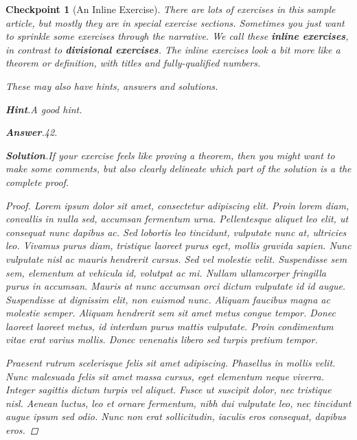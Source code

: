 \documentclass[pdflatex]{sn-jnl}
\theoremstyle{thmstyleone}%
\theoremstyle{thmstyletwo}%
\newtheorem{inlineexercise}[theorem]{Checkpoint}
\theoremstyle{thmstylethree}%
\newcommand{\blocktitlefont}{\relax}
\newcommand{\terminology}[1]{\textbf{#1}}
\numberwithin{equation}{section}
\begin{document}
\begin{inlineexercise}[An Inline Exercise]\label{inline-exercise}%
%
There are lots of exercises in this sample article, but mostly they are in special exercise sections.  Sometimes you just want to sprinkle some exercises through the narrative.  We call these \terminology{inline exercises}, in contrast to \terminology{divisional exercises}.  The inline exercises look a bit more like a theorem or definition, with titles and fully-qualified numbers.%
\par
These may also have hints, answers and solutions.%
\par\smallskip%
\noindent\textbf{\blocktitlefont Hint}.\hypertarget{inline-exercise-3}{}\quad{}A good hint.%
\par\smallskip%
\noindent\textbf{\blocktitlefont Answer}.\hypertarget{inline-exercise-4}{}\quad{}42.%
\par\smallskip%
\noindent\textbf{\blocktitlefont Solution}.\hypertarget{inline-exercise-5}{}\quad{}If your exercise feels like proving a theorem, then you might want to make some comments, but also clearly delineate which part of the solution is a the complete proof.%
\begin{proof}\label{inline-exercise-5-2}%
Lorem ipsum dolor sit amet, consectetur adipiscing elit. Proin lorem diam, convallis in nulla sed, accumsan fermentum urna. Pellentesque aliquet leo elit, ut consequat nunc dapibus ac. Sed lobortis leo tincidunt, vulputate nunc at, ultricies leo. Vivamus purus diam, tristique laoreet purus eget, mollis gravida sapien. Nunc vulputate nisl ac mauris hendrerit cursus. Sed vel molestie velit. Suspendisse sem sem, elementum at vehicula id, volutpat ac mi. Nullam ullamcorper fringilla purus in accumsan. Mauris at nunc accumsan orci dictum vulputate id id augue. Suspendisse at dignissim elit, non euismod nunc. Aliquam faucibus magna ac molestie semper. Aliquam hendrerit sem sit amet metus congue tempor. Donec laoreet laoreet metus, id interdum purus mattis vulputate. Proin condimentum vitae erat varius mollis. Donec venenatis libero sed turpis pretium tempor.%
\par
Praesent rutrum scelerisque felis sit amet adipiscing. Phasellus in mollis velit. Nunc malesuada felis sit amet massa cursus, eget elementum neque viverra. Integer sagittis dictum turpis vel aliquet. Fusce ut suscipit dolor, nec tristique nisl. Aenean luctus, leo et ornare fermentum, nibh dui vulputate leo, nec tincidunt augue ipsum sed odio. Nunc non erat sollicitudin, iaculis eros consequat, dapibus eros.%
\end{proof}
\end{inlineexercise}%
\end{document}
